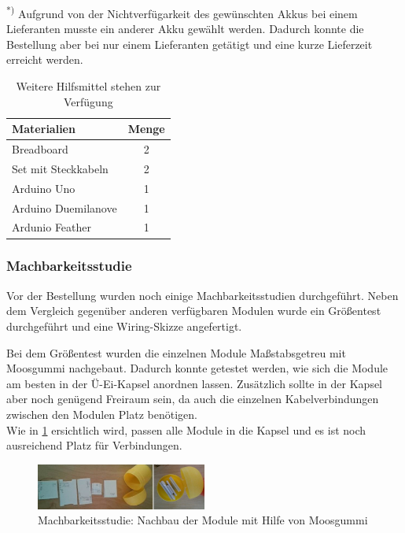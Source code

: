 {\textsuperscript{*)} Aufgrund von der Nichtverfügarkeit des gewünschten Akkus bei einem Lieferanten musste ein anderer Akku gewählt werden. Dadurch konnte die Bestellung aber bei nur einem Lieferanten getätigt und eine kurze Lieferzeit erreicht werden.

\begin{table}[h]
	\centering
	\begin{tabular}{|l|c|}
		\hline
		\textbf{Materialien} & \textbf{Menge} \\
		\hline
		Breadboard & 2 \\
		\hline
		Set mit Steckkabeln & 2 \\
		\hline
		Arduino Uno & 1 \\
		\hline	
		Arduino Duemilanove & 1 \\
		\hline	
		Ardunio Feather & 1\\
		\hline
	\end{tabular}
	\caption{Weitere Hilfsmittel stehen zur Verfügung}
	\label{tab:verfuegbareHW}
\end{table}



\subsubsection{Machbarkeitsstudie}

Vor der Bestellung wurden noch einige Machbarkeitsstudien durchgeführt. Neben dem Vergleich gegenüber anderen verfügbaren Modulen wurde ein Größentest durchgeführt und eine Wiring-Skizze angefertigt.

Bei dem Größentest wurden die einzelnen Module Maßstabsgetreu mit Moosgummi nachgebaut. Dadurch konnte getestet werden, wie sich die Module am besten in der Ü-Ei-Kapsel anordnen lassen. Zusätzlich sollte in der Kapsel aber noch genügend Freiraum sein, da auch die einzelnen Kabelverbindungen zwischen den Modulen Platz benötigen.  \\
Wie in \ref{fig:k3_machbarkeitsstudie} ersichtlich wird, passen alle Module in die Kapsel und es ist noch ausreichend Platz für Verbindungen.

\begin{figure}[ht]
	\centering
	\includegraphics[width=0.5\textwidth]{images/k3-machbarkeitsstudie.PNG}
	\caption {Machbarkeitsstudie: Nachbau der Module mit Hilfe von Moosgummi}
	\label{fig:k3_machbarkeitsstudie}
\end{figure}

}
